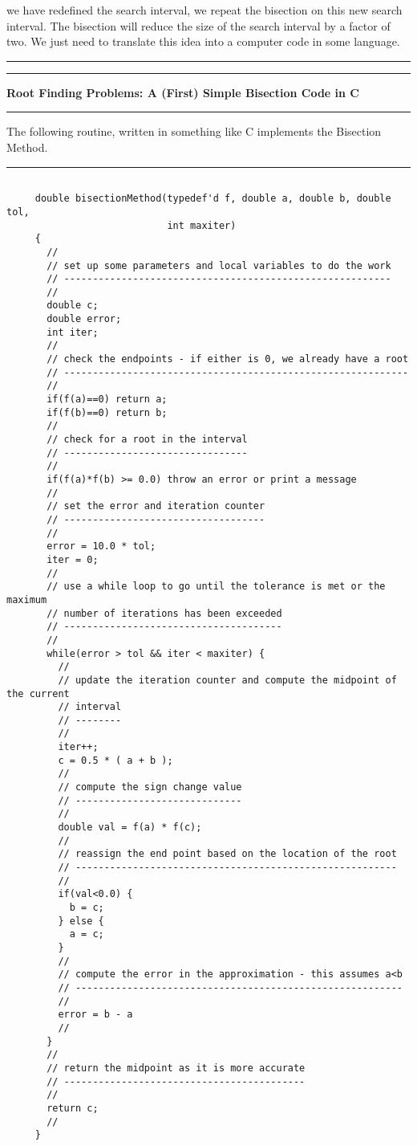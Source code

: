 \documentclass[10pt,fleqn]{article}
\begin{document}
we have redefined the search interval, we repeat the bisection on this new
search interval. The bisection will reduce the size of the search interval by
a factor of two. We just need to translate this idea into a computer code in
some language.
\vskip0.1in\hrule\vskip0.1in
\newpage
\vskip0.1in\hrule\vskip0.1in
\noindent
{\bf Root Finding Problems: A (First) Simple Bisection Code in C}
\vskip0.1in\hrule\vskip0.1in
\noindent
The following routine, written in something like C implements the Bisection
Method.
\vskip0.1in\hrule\vskip0.1in
\begin{verbatim}

     double bisectionMethod(typedef'd f, double a, double b, double tol,
                            int maxiter)
     {
       //
       // set up some parameters and local variables to do the work
       // ---------------------------------------------------------
       //
       double c;
       double error;
       int iter;
       //
       // check the endpoints - if either is 0, we already have a root
       // ------------------------------------------------------------
       //
       if(f(a)==0) return a;
       if(f(b)==0) return b;
       //
       // check for a root in the interval
       // --------------------------------
       //
       if(f(a)*f(b) >= 0.0) throw an error or print a message
       //
       // set the error and iteration counter
       // -----------------------------------
       //
       error = 10.0 * tol;
       iter = 0;
       //
       // use a while loop to go until the tolerance is met or the maximum 
       // number of iterations has been exceeded
       // --------------------------------------
       //
       while(error > tol && iter < maxiter) {
         //
         // update the iteration counter and compute the midpoint of the current
         // interval
         // --------
         //
         iter++;
         c = 0.5 * ( a + b );
         //
         // compute the sign change value
         // -----------------------------
         //
         double val = f(a) * f(c);
         //
         // reassign the end point based on the location of the root
         // --------------------------------------------------------
         //
         if(val<0.0) {
           b = c;
         } else {
           a = c;
         }
         //
         // compute the error in the approximation - this assumes a<b
         // ---------------------------------------------------------
         //
         error = b - a
         //
       }
       //
       // return the midpoint as it is more accurate
       // ------------------------------------------
       //
       return c;
       //
     }

\end{verbatim}
\end{document}
